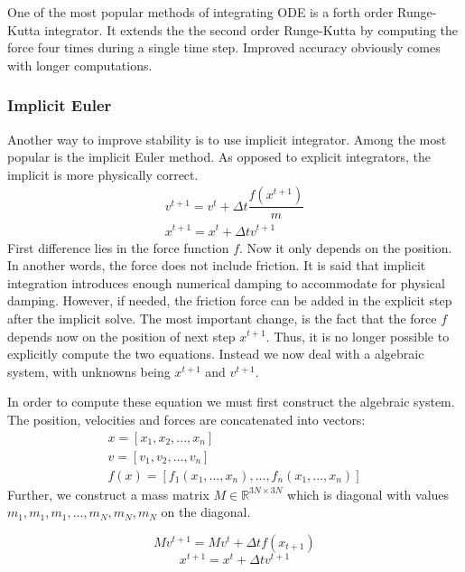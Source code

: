 \documentclass[en]{minipw} %
\begin{document}
One of the most popular methods of integrating ODE is a forth order Runge-Kutta integrator. It extends the the second order Runge-Kutta by computing the force four times during a single time step. Improved accuracy obviously comes with longer computations.

\subsubsection{Implicit Euler}
Another way to improve stability is to use implicit integrator. Among the most popular is the implicit Euler method. As opposed to explicit integrators, the implicit is more physically correct.
\begin{equation}
\label{eq:implicit_euler_ode_v}
\begin{aligned}
v^{t+1} = v^{t} + \Delta t \dfrac{f(x^{t+1})}{m}
\\
x^{t+1} = x^{t} + \Delta t v^{t+1}
\end{aligned}
\end{equation}
First difference lies in the force function $f$. Now it only depends on the position. In another words, the force does not include friction. It is said that implicit integration introduces enough numerical damping to accommodate for physical damping. However, if needed, the friction force can be added in the explicit step after the implicit solve. The most important change, is the fact that the force $f$ depends now on the position of next step $x^{t+1}$. Thus, it is no longer possible to explicitly compute the two equations. Instead we now deal with a algebraic system, with unknowns being $x^{t+1}$ and $v^{t+1}$.

In order to compute these equation we must first construct the algebraic system. The position, velocities and forces are concatenated into vectors:
\begin{equation}
\begin{aligned}
x = [x_1, x_2, ..., x_n]
\\
v = [v_1, v_2, ..., v_n]
\\
f(x) = [f_1(x_1,..., x_n), ..., f_n(x_1,..., x_n)]
\end{aligned}
\end{equation}
Further, we construct a mass matrix $M \in \mathbb{R}^{3N \times 3N}$ which is diagonal with values $m_1, m_1, m_1, ..., m_N, m_N, m_N$ on the diagonal.

\begin{equation}
\label{eq:implicit_mass_ode_v}
M v^{t+1} = M v^{t} + \Delta t f(x_{t+1})
\end{equation}
\begin{equation}
\label{eq:implicit_mass_ode_x}
x^{t+1} = x^{t} + \Delta t v^{t+1}
\end{equation}
\end{document}
